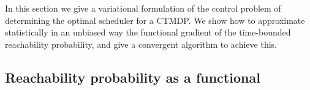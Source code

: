 In this section we give a variational formulation of the control problem of determining the optimal scheduler for a CTMDP. 
We show how to approximate statistically in an unbiased way the functional gradient of the time-bounded reachability probability, and give a convergent algorithm to achieve this. 





\subsection{Reachability probability as a functional}












